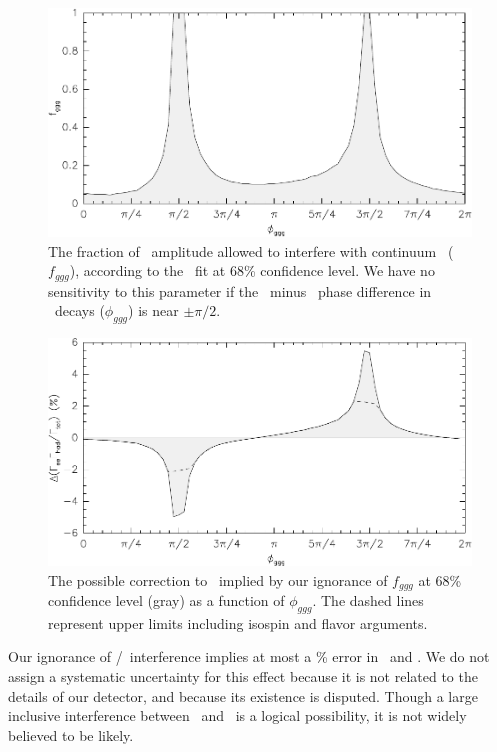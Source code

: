 \documentclass{cornell}
\begin{document}
\begin{figure}[p]
  \begin{center}
    \includegraphics[width=0.8\linewidth]{plots/intconstraint}
  \end{center}
  \caption{\label{intconstraint} The fraction of \ggg\ amplitude
  allowed to interfere with continuum \qqbar\ ($f_{ggg}$), according
  to the \us\ fit at 68\% confidence level.  We have no sensitivity to
  this parameter if the \ggg\ minus \qqbar\ phase difference in \ups\
  decays ($\phi_{ggg}$) is near $\pm\pi/2$.}
\end{figure}

\begin{figure}[p]
  \begin{center}
    \includegraphics[width=0.8\linewidth]{plots/areaconstraint}
  \end{center}
  \caption{\label{areaconstraint} The possible correction to
  \geehadtot\ implied by our ignorance of $f_{ggg}$ at 68\% confidence
  level (gray) as a function of $\phi_{ggg}$.  The dashed lines
  represent upper limits including isospin and flavor arguments.}
\end{figure}

Our ignorance of \ggg/\qqbar\ interference implies at most a \bork\%
error in \geehadtot\ and \gee.  We do not assign a systematic
uncertainty for this effect because it is not related to the details
of our detector, and because its existence is disputed.  Though a
large inclusive interference between \qqbar\ and \ggg\ is a logical
possibility, it is not widely believed to be likely.
\end{document}
